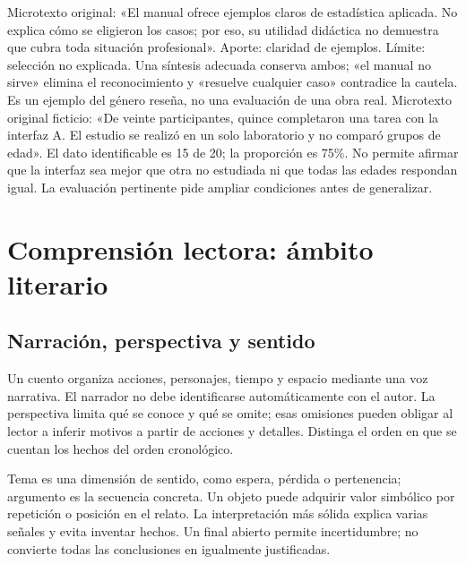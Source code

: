 Microtexto original: «El manual ofrece ejemplos claros de estadística aplicada. No explica cómo se eligieron los casos; por eso, su utilidad didáctica no demuestra que cubra toda situación profesional». Aporte: claridad de ejemplos. Límite: selección no explicada. Una síntesis adecuada conserva ambos; «el manual no sirve» elimina el reconocimiento y «resuelve cualquier caso» contradice la cautela. Es un ejemplo del género reseña, no una evaluación de una obra real.
Microtexto original ficticio: «De veinte participantes, quince completaron una tarea con la interfaz A. El estudio se realizó en un solo laboratorio y no comparó grupos de edad». El dato identificable es 15 de 20; la proporción es 75\%. No permite afirmar que la interfaz sea mejor que otra no estudiada ni que todas las edades respondan igual. La evaluación pertinente pide ampliar condiciones antes de generalizar.

\section{Comprensión lectora: ámbito literario}\label{sec:l2}
\subsection{Narración, perspectiva y sentido}
Un cuento organiza acciones, personajes, tiempo y espacio mediante una voz narrativa. El narrador no debe identificarse automáticamente con el autor. La perspectiva limita qué se conoce y qué se omite; esas omisiones pueden obligar al lector a inferir motivos a partir de acciones y detalles. Distinga el orden en que se cuentan los hechos del orden cronológico.

Tema es una dimensión de sentido, como espera, pérdida o pertenencia; argumento es la secuencia concreta. Un objeto puede adquirir valor simbólico por repetición o posición en el relato. La interpretación más sólida explica varias señales y evita inventar hechos. Un final abierto permite incertidumbre; no convierte todas las conclusiones en igualmente justificadas.

